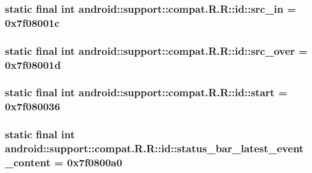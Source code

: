 \hypertarget{classandroid_1_1support_1_1compat_1_1_r_1_1id_fb39c8facfcbecf7c46214ffbdb04365}{
\subsubsection[{src\_\-in}]{\setlength{\rightskip}{0pt plus 5cm}static final int android::support::compat.R.R::id::src\_\-in = 0x7f08001c}}
\label{classandroid_1_1support_1_1compat_1_1_r_1_1id_fb39c8facfcbecf7c46214ffbdb04365}


\hypertarget{classandroid_1_1support_1_1compat_1_1_r_1_1id_c02405237770d408d98f54ffac01a7c2}{
\subsubsection[{src\_\-over}]{\setlength{\rightskip}{0pt plus 5cm}static final int android::support::compat.R.R::id::src\_\-over = 0x7f08001d}}
\label{classandroid_1_1support_1_1compat_1_1_r_1_1id_c02405237770d408d98f54ffac01a7c2}


\hypertarget{classandroid_1_1support_1_1compat_1_1_r_1_1id_6c8ec3a65d31a1082a1156f402665fa1}{
\subsubsection[{start}]{\setlength{\rightskip}{0pt plus 5cm}static final int android::support::compat.R.R::id::start = 0x7f080036}}
\label{classandroid_1_1support_1_1compat_1_1_r_1_1id_6c8ec3a65d31a1082a1156f402665fa1}


\hypertarget{classandroid_1_1support_1_1compat_1_1_r_1_1id_73ec2192d0d86d28f5cd862e4e0d709d}{
\subsubsection[{status\_\-bar\_\-latest\_\-event\_\-content}]{\setlength{\rightskip}{0pt plus 5cm}static final int android::support::compat.R.R::id::status\_\-bar\_\-latest\_\-event\_\-content = 0x7f0800a0}}
\label{classandroid_1_1support_1_1compat_1_1_r_1_1id_73ec2192d0d86d28f5cd862e4e0d709d}


